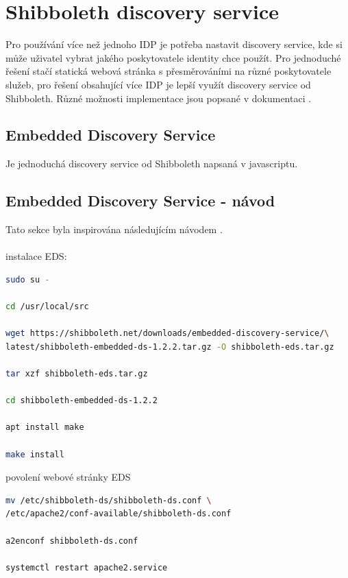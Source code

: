 \section{Shibboleth discovery service}
Pro používání více než jednoho IDP je potřeba nastavit discovery service, kde si může uživatel vybrat jakého poskytovatele identity chce použít. Pro jednoduché řešení stačí statická webová stránka s přesměrováními na různé poskytovatele služeb, pro řešení obsahující více IDP je lepší využít discovery service od Shibboleth. Různé možnosti implementace jsou popsané v dokumentaci \cite{IdPDiscovery}.

\subsection{Embedded Discovery Service}
Je jednoduchá discovery service od Shibboleth napsaná v javascriptu. 

\subsection{Embedded Discovery Service - návod}
Tato sekce byla inspirována následujícím návodem \cite{EDS-tut}. \\ \\
instalace EDS:
\begin{lstlisting}[language=Bash]
sudo su -

cd /usr/local/src

wget https://shibboleth.net/downloads/embedded-discovery-service/\
latest/shibboleth-embedded-ds-1.2.2.tar.gz -O shibboleth-eds.tar.gz

tar xzf shibboleth-eds.tar.gz

cd shibboleth-embedded-ds-1.2.2

apt install make

make install
\end{lstlisting}

povolení webové stránky EDS

\begin{lstlisting}[language=Bash]
mv /etc/shibboleth-ds/shibboleth-ds.conf \
/etc/apache2/conf-available/shibboleth-ds.conf

a2enconf shibboleth-ds.conf

systemctl restart apache2.service
\end{lstlisting}

